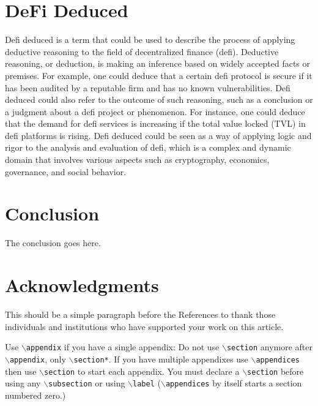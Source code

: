 \documentclass[lettersize,journal]{IEEEtran}
\begin{document}
\section{DeFi Deduced}

Defi deduced is a term that could be used to describe the process of applying deductive reasoning to the field of decentralized finance (defi). Deductive reasoning, or deduction, is making an inference based on widely accepted facts or premises. For example, one could deduce that a certain defi protocol is secure if it has been audited by a reputable firm and has no known vulnerabilities. Defi deduced could also refer to the outcome of such reasoning, such as a conclusion or a judgment about a defi project or phenomenon. For instance, one could deduce that the demand for defi services is increasing if the total value locked (TVL) in defi platforms is rising. Defi deduced could be seen as a way of applying logic and rigor to the analysis and evaluation of defi, which is a complex and dynamic domain that involves various aspects such as cryptography, economics, governance, and social behavior.


\section{Conclusion}
The conclusion goes here.


\section*{Acknowledgments}
This should be a simple paragraph before the References to thank those individuals and institutions who have supported your work on this article.



{
Use $\backslash${\tt{appendix}} if you have a single appendix:
Do not use $\backslash${\tt{section}} anymore after $\backslash${\tt{appendix}}, only $\backslash${\tt{section*}}.
If you have multiple appendixes use $\backslash${\tt{appendices}} then use $\backslash${\tt{section}} to start each appendix.
You must declare a $\backslash${\tt{section}} before using any $\backslash${\tt{subsection}} or using $\backslash${\tt{label}} ($\backslash${\tt{appendices}} by itself
 starts a section numbered zero.)}



\end{document}
